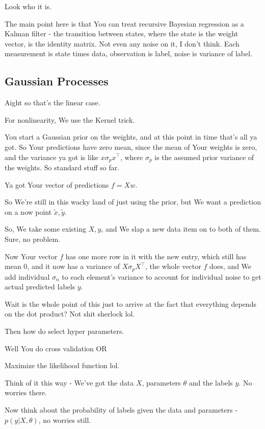 \documentclass{article}
\begin{document}
			Look who it is.
			
			The main point here is that You can treat recursive Bayesian regression as a Kalman filter - the transition between states, where the state is the weight vector, is the identity matrix. Not even any noise on it, I don't think. Each measurement is state times data, observation is label, noise is variance of label.

	\subsection{Gaussian Processes}
	
		Aight so that's the linear case. 
		
		For nonlinearity, We use the Kernel trick.
		
		You start a Gaussian prior on the weights, and at this point in time that's all ya got. So Your predictions have zero mean, since the mean of Your weights is zero, and the variance ya got is like $x\sigma_p x^\top$, where $\sigma_p$ is the assumed prior variance of the weights. So standard stuff so far. 
		
		Ya got Your vector of predictions $f = Xw$.
		
		So We're still in this wacky land of just using the prior, but We want a prediction on a now point $\tilde{x}, \tilde{y}$.
		
		So, We take some existing $X, y$, and We slap a new data item on to both of them. Sure, no problem.
		
		Now Your vector $f$ has one more row in it with the new entry, which still has mean 0, and it now has a variance of $X\sigma_p X^\top$, the whole vector $f$ does, and We add individual $\sigma_n$ to each element's variance to account for individual noise to get actual predicted labels $y$.
		
		Wait is the whole point of this just to arrive at the fact that everything depends on the dot product? Not shit sherlock lol.
	
		Then how do select hyper parameters.
		
		Well You do cross validation OR
		
		Maximize the likelihood function lol.
		
		Think of it this way - We've got the data $X$, parameters $\theta$ and the labels $y$. No worries there.
		
		Now think about the probability of labels given the data and parameters - $p(y|X, \theta)$, no worries still.
		
\end{document}
